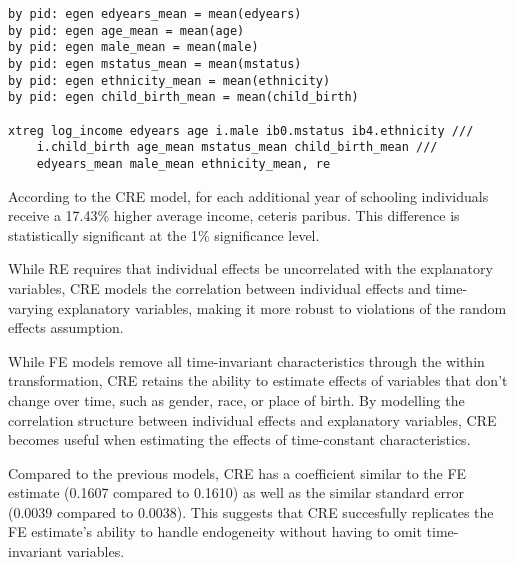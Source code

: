 

\begin{verbatim}
by pid: egen edyears_mean = mean(edyears)
by pid: egen age_mean = mean(age)
by pid: egen male_mean = mean(male)
by pid: egen mstatus_mean = mean(mstatus)
by pid: egen ethnicity_mean = mean(ethnicity)
by pid: egen child_birth_mean = mean(child_birth)

xtreg log_income edyears age i.male ib0.mstatus ib4.ethnicity ///
    i.child_birth age_mean mstatus_mean child_birth_mean ///
    edyears_mean male_mean ethnicity_mean, re
\end{verbatim}

According to the CRE model, for each additional year of schooling individuals receive a 17.43\% higher average income, ceteris paribus. This difference is statistically significant at the 1\% significance level.


While RE requires that individual effects be uncorrelated with the explanatory variables, CRE models the correlation between individual effects and time-varying explanatory variables, making it more robust to violations of the random effects assumption.



While FE models remove all time-invariant characteristics through the within transformation, CRE retains the ability to estimate effects of variables that don't change over time, such as gender, race, or place of birth. By modelling the correlation structure between individual effects and explanatory variables, CRE becomes useful when estimating the effects of time-constant characteristics.


Compared to the previous models, CRE has a coefficient similar to the FE estimate (0.1607 compared to 0.1610) as well as the similar standard error (0.0039 compared to 0.0038). This suggests that CRE succesfully replicates the FE estimate's ability to handle endogeneity without having to omit time-invariant variables.

